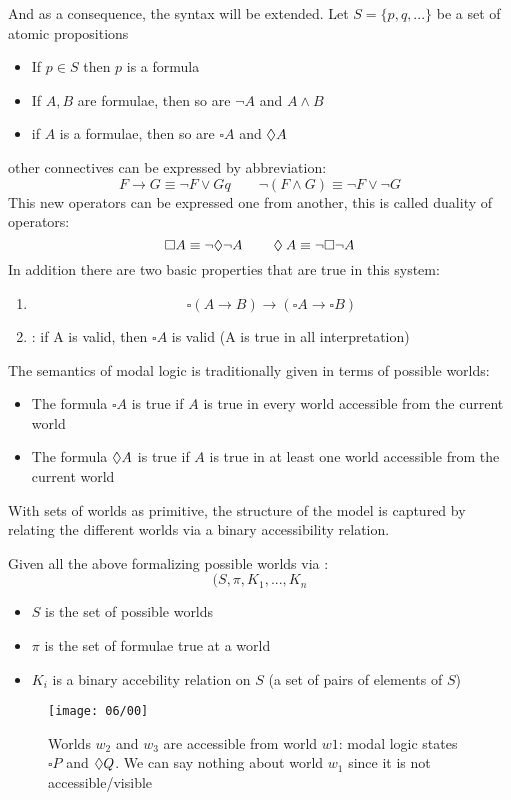  And as a consequence, the syntax will be extended. Let $S=\{p,q,...\}$ be a set of atomic propositions
\begin{itemize}
\item If $p\in S$ then $p$ is a formula
\item If $A, B$ are formulae, then so are $\neg{A}$ and $A \land B$
\item if $A$ is a formulae, then so are $\square A$ and $\mathbin{\Diamond} A$
\end{itemize}
other connectives can be expressed by abbreviation:
\[F\rightarrow G \equiv \neg{F} \lor G q\qquad \neg{(F\land G)} \equiv \neg{F} \lor \neg{G}\]
This new operators can be expressed one from another, this is called duality of operators:
\[\square A \equiv \neg{\mathbin{\Diamond}} \neg{A}\qquad \mathbin{\Diamond} A \equiv \neg{\square} \neg{A}\]
In addition there are two basic properties that are true in this system:
\begin{enumerate}
\item {}
\[\square (A\rightarrow B ) \rightarrow (\square A \rightarrow \square B)\]
\item {}: if A is valid, then $\square A$ is valid (A is true in all interpretation)
\end{enumerate}

The semantics of modal logic is traditionally given in terms of possible worlds:
\begin{itemize}
\item The formula $\square A$ is true if $A$ is true in every world accessible from the current world
\item The formula $\mathbin{\Diamond} A$ is true if $A$ is true in at least one world accessible from the current world
\end{itemize}
With sets of worlds as primitive, the structure of the model is captured by relating the different worlds via a binary accessibility relation.

Given all the above formalizing possible worlds via :
\[(S, \pi, K_1, ... , K_n\]
\begin{itemize}
\item $S$ is the set of possible worlds
\item $\pi$ is the set of formulae true at a world
\item $K_i$ is a binary accebility relation on $S$ (a set of pairs of elements of $S$)
\end{itemize}
\begin{figure}[!h]
\centering
\texttt{[image: 06/00]}
\caption{Worlds $w_2$ and $w_3$ are accessible from world $w1$: modal logic states $\square P$ and $\mathbin{\Diamond} Q$. We can say nothing about world $w_1$ since it is not accessible/visible}
\end{figure}

